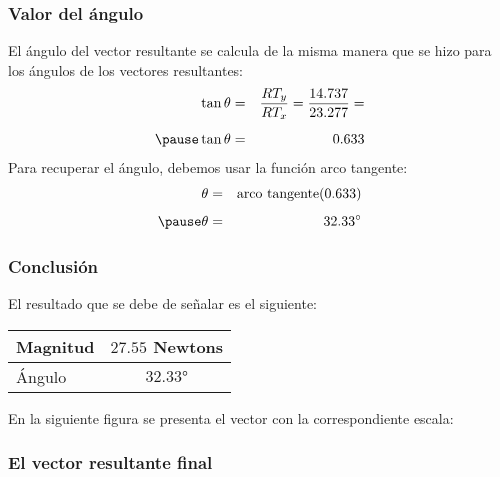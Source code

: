 \documentclass[14pt, xcolor={usenames,dvipsnames}]{beamer}
\begin{document}
\begin{frame}
\frametitle{Valor del ángulo}
El ángulo del vector resultante se calcula de la misma manera que se hizo para los ángulos de los vectores resultantes:
\begin{eqnarray*}
\tan \theta &=& \dfrac{RT_{y}}{RT_{x}} = \dfrac{14.737}{23.277} = \\[0.5em] \pause
\tan \theta &=& 0.633
\end{eqnarray*}
\pause
Para recuperar el ángulo, debemos usar la función arco tangente:
\begin{eqnarray*}
\theta &=& \text{arco tangente} (0.633) \\[0.5em] \pause
\theta &=& \ang{32.33}
\end{eqnarray*}
\end{frame}
\begin{frame}
\frametitle{Conclusión}
El resultado que se debe de señalar es el siguiente:
\renewcommand{\arraystretch}{1.5}
\begin{table}
\begin{tabular}{l | c}
Magnitud & $27.55$ Newtons \\ \hline
Ángulo & $\ang{32.33}$
\end{tabular}
\end{table}
En la siguiente figura se presenta el vector con la correspondiente escala:
\end{frame}
\begin{frame}
\frametitle{El vector resultante final}
\begin{figure}
\centering
{}
\end{figure}
\end{frame}
\end{document}
